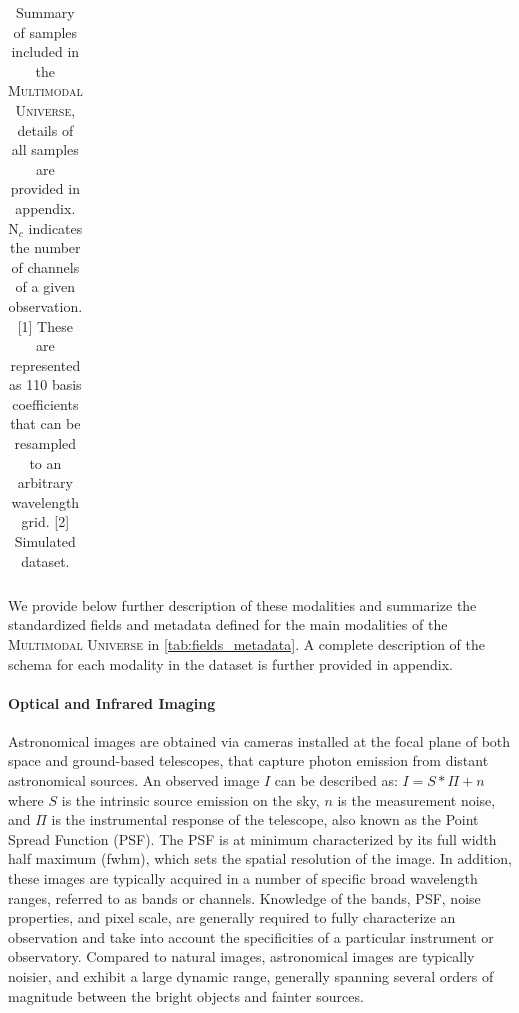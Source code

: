 \documentclass[dvipsnames,table]{article}
\newcommand\pile{\textsc{Multimodal Universe}\xspace}
\begin{document}
\begin{table}[ht]
\begin{threeparttable}[b]
{\begin{tabular}{c l c c c c}
        \bottomrule
    \end{tabular}}
    \caption{\small Summary of samples included in the \pile, details of all samples are provided in appendix. 
    N$_c$ indicates the number of channels of a given observation.  [1] These are represented as 110 basis coefficients that can be resampled to an arbitrary wavelength grid. [2] Simulated dataset.
    }
    \label{tab:data_summary}
    \end{threeparttable}
\end{table}

We provide below further description of these modalities and summarize the standardized fields and metadata defined for the main modalities of the \pile in \autoref{tab:fields_metadata}. A complete description of the schema for each modality in the dataset is further provided in appendix.




\paragraph{Optical and Infrared Imaging} Astronomical images are obtained via cameras installed at the focal plane of both space and ground-based telescopes, that capture photon emission from distant astronomical sources. An observed image $I$ can be described as: $I = S \ast \Pi + n $ where $S$ is the intrinsic source emission on the sky, $n$ is the measurement noise, and $\Pi$ is the instrumental response of the telescope, also known as the Point Spread Function (PSF). The PSF is at minimum characterized by its full width half maximum (fwhm), which sets the spatial resolution of the image. In addition, these images are typically acquired in a number of specific broad wavelength ranges, referred to as bands or channels. Knowledge of the bands, PSF, noise properties, and pixel scale, are generally required to fully characterize an observation and take into account the specificities of a particular instrument or observatory. Compared to natural images, astronomical images are typically noisier, and exhibit a large dynamic range, generally spanning several orders of magnitude between the bright objects and fainter sources.
\end{document}

